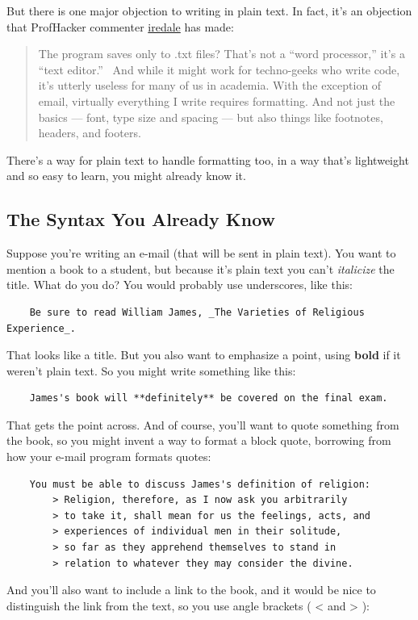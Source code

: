 But there is one major objection to writing in plain text. In fact, it's
an objection that ProfHacker commenter
\href{http://chronicle.com/blogs/profhacker/profhacking-the-ultimate-word-processor/33369\#comment-207000625}{iredale}
has made:

\begin{quote}
The program saves only to .txt files? That's not a ``word processor,''
it's a ``text editor.'' ~And while it might work for techno-geeks who
write code, it's utterly useless for many of us in academia. With the
exception of email, virtually everything I write requires formatting.
And not just the basics --- font, type size and spacing --- but also
things like footnotes, headers, and footers.

\end{quote}
There's a way for plain text to handle formatting too, in a way that's
lightweight and so easy to learn, you might already know it.

\subsection{The Syntax You Already Know}

Suppose you're writing an e-mail (that will be sent in plain text). You
want to mention a book to a student, but because it's plain text you
can't \emph{italicize} the title. What do you do? You would probably use
underscores, like this:

\begin{verbatim}
    Be sure to read William James, _The Varieties of Religious Experience_.
\end{verbatim}
That looks like a title. But you also want to emphasize a point, using
\textbf{bold} if it weren't plain text. So you might write something
like this:

\begin{verbatim}
    James's book will **definitely** be covered on the final exam.
\end{verbatim}
That gets the point across. And of course, you'll want to quote
something from the book, so you might invent a way to format a block
quote, borrowing from how your e-mail program formats quotes:

\begin{verbatim}
    You must be able to discuss James's definition of religion:
        > Religion, therefore, as I now ask you arbitrarily
        > to take it, shall mean for us the feelings, acts, and 
        > experiences of individual men in their solitude,
        > so far as they apprehend themselves to stand in
        > relation to whatever they may consider the divine.
\end{verbatim}
And you'll also want to include a link to the book, and it would be nice
to distinguish the link from the text, so you use angle brackets (
\textless{} and \textgreater{} ):

